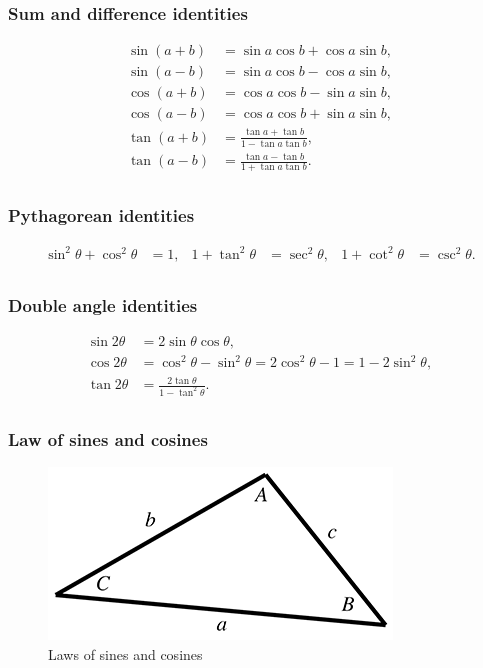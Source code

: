\documentclass[a4paper,11pt]{article}
\begin{document}
\subsubsection{Sum and difference identities}

\[\begin{matrix}
{\sin(a + b)} & {= \sin a\cos b + \cos a\sin b,} \\
{\sin(a - b)} & {= \sin a\cos b - \cos a\sin b,} \\
{\cos(a + b)} & {= \cos a\cos b - \sin a\sin b,} \\
{\cos(a - b)} & {= \cos a\cos b + \sin a\sin b,} \\
{\tan(a + b)} & {= \frac{\tan a + \tan b}{1 - \tan a\tan b},} \\
{\tan(a - b)} & {= \frac{\tan a - \tan b}{1 + \tan a\tan b}.} \\
\end{matrix}\]

\subsubsection{Pythagorean identities}

\[\begin{matrix}
{\sin^{2}\theta + \cos^{2}\theta} & {= 1,} & {1 + \tan^{2}\theta} & {= \sec^{2}\theta,} & {1 + \cot^{2}\theta} & {= \csc^{2}\theta.} \\
\end{matrix}\]

\subsubsection{Double angle identities}

\[\begin{matrix}
{\sin 2\theta} & {= 2\sin\theta\cos\theta,} \\
{\cos 2\theta} & {= \cos^{2}\theta - \sin^{2}\theta = 2\cos^{2}\theta - 1 = 1 - 2\sin^{2}\theta,} \\
{\tan 2\theta} & {= \frac{2\tan\theta}{1 - \tan^{2}\theta}.} \\
\end{matrix}\]

\subsubsection{Law of sines and cosines}

\begin{figure}[H]
\centering
    \includegraphics{01_laws}
\caption{Laws of sines and cosines}
\label{fig:laws-of-sines-and-cosines}
\end{figure}
\end{document}
